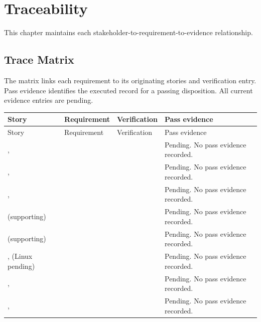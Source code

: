 \chapter{Traceability}
\label{Section:TraceabilityResponsibility}
This chapter maintains each stakeholder-to-requirement-to-evidence relationship.


\section{Trace Matrix}
The matrix links each requirement to its originating stories and verification
entry. Pass evidence identifies the executed record for a passing disposition.
All current evidence entries are pending.

\small
\begin{tabularx}{\linewidth}{L{2.9cm}L{2.45cm}L{2.45cm}Y}
\caption{Trace Matrix\label{Table:TraceabilityMatrix}}\\
\toprule
Story & Requirement & Verification & Pass evidence\\\midrule
\endfirsthead
\toprule
Story & Requirement & Verification & Pass evidence\\\midrule
\endhead
\bottomrule
\endlastfoot
{},  &  &  & Pending. No pass evidence recorded.\\
,  &  &  & Pending. No pass evidence recorded.\\
,  &  &  & Pending. No pass evidence recorded.\\
 (supporting) &  &  & Pending. No pass evidence recorded.\\
 (supporting) &  &  & Pending. No pass evidence recorded.\\
,  (Linux pending) &  &  & Pending. No pass evidence recorded.\\
,  &  &  & Pending. No pass evidence recorded.\\
,  &  &  & Pending. No pass evidence recorded.\\

\end{tabularx}
